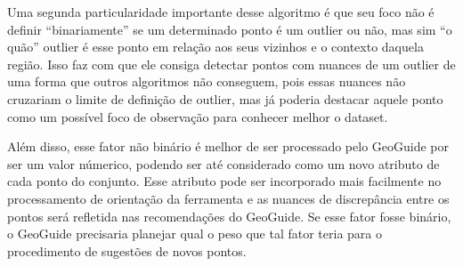 Uma segunda particularidade importante desse algoritmo é que seu foco não é definir ``binariamente'' se um determinado ponto é um outlier ou não, mas sim ``o quão'' outlier é esse ponto em relação aos seus vizinhos e o contexto daquela região. Isso faz com que ele consiga detectar pontos com nuances de um outlier de uma forma que outros algoritmos não conseguem, pois essas nuances não cruzariam o limite de definição de outlier, mas já poderia destacar aquele ponto como um possível foco de observação para conhecer melhor o dataset.

Além disso, esse fator não binário é melhor de ser processado pelo GeoGuide por ser um valor númerico, podendo ser até considerado como um novo atributo de cada ponto do conjunto. Esse atributo pode ser incorporado mais facilmente no processamento de orientação da ferramenta e as nuances de discrepância entre os pontos será refletida nas recomendações do GeoGuide. Se esse fator fosse binário, o GeoGuide precisaria planejar qual o peso que tal fator teria para o procedimento de sugestões de novos pontos.
